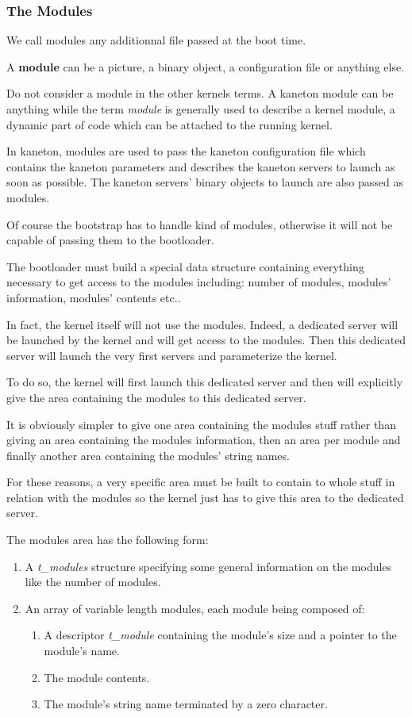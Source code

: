 \subsubsection{The Modules}

We call modules any additionnal file passed at the boot time.

A \textbf{module} can be a picture, a binary object, a configuration file
or anything else.

Do not consider a module in the other kernels terms. A kaneton module
can be anything while the term \textit{module} is generally used to describe
a kernel module, a dynamic part of code which can be attached to the
running kernel.

In kaneton, modules are used to pass the kaneton configuration file
which contains the kaneton parameters and describes the kaneton servers
to launch as soon as possible. The kaneton servers' binary objects to
launch are also passed as modules.

Of course the bootstrap has to handle kind of modules, otherwise it will
not be capable of passing them to the bootloader.

The bootloader must build a special data structure containing everything
necessary to get access to the modules including: number of modules,
modules' information, modules' contents etc..

In fact, the kernel itself will not use the modules. Indeed, a dedicated
server will be launched by the kernel and will get access to the modules.
Then this dedicated server will launch the very first servers and
parameterize the kernel.

To do so, the kernel will first launch this dedicated server and then
will explicitly give the area containing the modules to this dedicated
server.

It is obviously simpler to give one area containing the modules
stuff rather than giving an area containing the modules information, then
an area per module and finally another area containing the modules' string
names.

For these reasons, a very specific area must be built to contain
to whole stuff in relation with the modules so the kernel just has to
give this area to the dedicated server.

The modules area has the following form:

\begin{enumerate}
  \item
    A \textit{t\_modules} structure specifying some general information on
    the modules like the number of modules.
  \item
    An array of variable length modules, each module being composed of:

    \begin{enumerate}
      \item
	A descriptor \textit{t\_module} containing the module's size and
	a pointer to the module's name.
      \item
	The module contents.
      \item
	The module's string name terminated by a zero character.
    \end{enumerate}
\end{enumerate}

